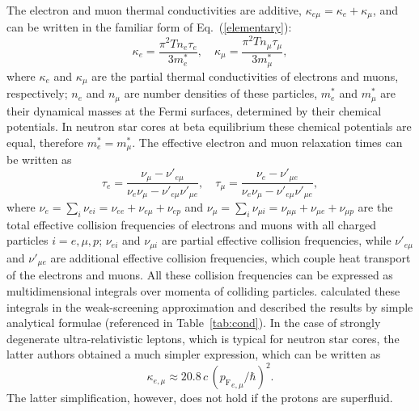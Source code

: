 \documentclass[smallextended]{svjour3}       %
\newcommand{\beq}{\begin{equation}}
\newcommand{\eeq}{\end{equation}}
\newcommand{\pF}{p_\mathrm{F}}
\newcommand{\req}[1]{Eq.~(\ref{#1})}
\begin{document}
The electron and muon thermal conductivities are additive,
$\kappa_{e\mu}=\kappa_e+\kappa_\mu$, and can be written 
in the familiar form of \req{elementary}:
\beq
    \kappa_e=\frac{\pi^2 T n_e \tau_e }{ 3m_e^*}, \quad
     \kappa_\mu=\frac{\pi^2 T n_\mu \tau_\mu }{ 3m_\mu^*},
\label{kappa-emu}
\eeq
where $\kappa_e$ and $\kappa_\mu$ are the partial thermal
conductivities of electrons and muons, respectively; $n_e$
and $n_\mu$ are number densities of these particles, $m_e^*$
and $m_\mu^*$ are their dynamical masses at the Fermi
surfaces, determined by their chemical potentials. In
neutron star cores at beta equilibrium these chemical
potentials are equal, therefore $m_e^*=m_\mu^*$. The
effective electron and muon relaxation times can be written
as \citep{GnedinYakovlev95}
\beq
   \tau_e =
   \frac{\nu_\mu -\nu'_{e\mu} }{ \nu_e \nu_\mu - \nu'_{e\mu}\nu'_{\mu e}},
   \quad
   \tau_\mu =
   \frac{\nu_e -\nu'_{\mu e} }{ \nu_e \nu_\mu - \nu'_{e\mu}\nu'_{\mu e}},
\label{taus}
\eeq
where
$
     \nu_e = \sum_i \nu_{ei}=\nu_{ee}+\nu_{e \mu}+\nu_{ep}
$
and
$  
     \nu_\mu = \sum_i \nu_{\mu i}=\nu_{\mu \mu}+ \nu_{\mu e}+ \nu_{\mu p}
$
are the total effective collision frequencies of electrons
and muons with all charged particles $i=e,\mu,p$; 
$\nu_{ei}$ and $\nu_{\mu i}$ are partial effective collision
frequencies, while $\nu'_{e \mu}$ and $\nu'_{\mu e}$ are
additional effective collision frequencies, which couple
heat transport of the electrons and muons. All these 
collision frequencies can be expressed as multidimensional
integrals over momenta of colliding particles.
\citet{ShterninYakovlev07} calculated these integrals in the
weak-screening approximation and described the results by
simple analytical formulae (referenced in
Table~\ref{tab:cond}). In the case of strongly degenerate
ultra-relativistic leptons, which is typical for neutron
star cores, the latter authors obtained a much simpler
expression, which can be written as
\beq
    \kappa_{e,\mu} \approx 20.8 \,c\, ({\pF}_{e,\mu}/\hbar)^2.
\eeq
The latter simplification, however, does not hold if the
protons are superfluid.

\end{document}
